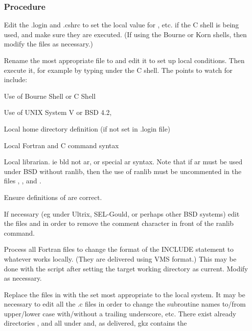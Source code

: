 \subsubsection{\protect\label{sec:proc}Procedure}
\begin{OL}
\item
Edit the .login and .cshrc to set the local value for , etc.
if the C shell is being used, and make sure they are executed.
(If using the Bourne or Korn shells, then modify the files
as necessary.)
\item
Rename the most appropriate file to  and edit
it to set up local conditions. Then execute it,
for example by typing  under the C shell.
The points to watch for include:
\begin{UL}
\item Use of Bourne Shell or C Shell
\item Use of UNIX System V or BSD 4.2,
\item Local home directory definition (if not set in .login file)
\item Local Fortran and C command syntax
\item Local librarian. ie bld not ar, or special ar syntax.
Note that if ar must be used under BSD without ranlib, then the use of
ranlib must be uncommented in the files , 
, and .
\item Ensure definitions of  are correct.
\end{UL}
\item If necessary (eg under Ultrix, SEL-Gould, or perhaps other BSD systems)
edit the files  and  in order to remove the
comment character in front of the ranlib command.
\item Process all Fortran files to change the format of the INCLUDE
statement to whatever works locally. (They are delivered using
VMS format.)
This may be done with the script  after setting
the target working directory as current. Modify 
as necessary.
\item Replace the files in  with the set most
appropriate to the local system. It may be necessary to edit
all the .c files in order to change the subroutine names to/from
upper/lower case with/without a trailing underscore, etc.
There exist already directories , 
 and 
all under  and, as delivered, gkz contains the

\end{OL}
